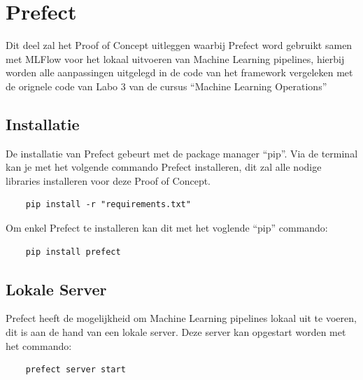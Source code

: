 \section{Prefect}
Dit deel zal het Proof of Concept uitleggen waarbij Prefect word gebruikt samen met MLFlow voor het lokaal uitvoeren van Machine Learning pipelines, hierbij worden alle aanpassingen uitgelegd in de code van het framework vergeleken met de orignele code van Labo 3 van de cursus ``Machine Learning Operations''
\subsection{Installatie}
De installatie van Prefect gebeurt met de package manager ``pip''. Via de terminal kan je met het volgende commando Prefect installeren, dit zal alle nodige libraries installeren voor deze Proof of Concept.
\begin{verbatim}
    pip install -r "requirements.txt"
\end{verbatim}

Om enkel Prefect te installeren kan dit met het voglende ``pip'' commando:
\begin{verbatim}
    pip install prefect
\end{verbatim}

\subsection{Lokale Server}
Prefect heeft de mogelijkheid om Machine Learning pipelines lokaal uit te voeren, dit is aan de hand van een lokale server. 
Deze server kan opgestart worden met het commando: 
\begin{verbatim}
    prefect server start
\end{verbatim}



